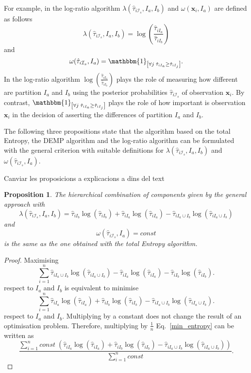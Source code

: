 \documentclass[10pt, a4paper]{article}
\newtheorem{prop}{Proposition}
\newcommand{\m}[1]{\boldsymbol{#1}}
\begin{document}
For example, in the log-ratio algorithm $\lambda(\hat{\tau}_{i \mathcal{I}_s}, I_a, I_b)$ and $\omega(\m x_i, I_a)$ are defined as follows
\[
\lambda(\hat{\tau}_{i \mathcal{I}_s}, I_a, I_b) = \log( \frac{ \hat{\tau}_{iI_a} }{ \hat{\tau}_{iI_b} })
\]
and
\[
\omega(\hat{\tau}_{i \mathcal{I}_s}, I_a) = \mathbbm{1}_{\left[ \forall j\; \hat{\tau}_{i I_{a}} \geq \hat{\tau}_{iI_j} \right]}.
\]
In the log-ratio algorithm $\log( \frac{ \hat{\tau}_{iI_a} }{ \hat{\tau}_{iI_b} })$ plays the role of measuring how different are partition $I_a$ and $I_b$ using the posterior probabilities $\hat{\tau}_{i \mathcal{I}_s}$ of observation $\m x_i$. By contrast, $\mathbbm{1}_{\left[ \forall j\; \hat{\tau}_{i I_{a}} \geq \hat{\tau}_{iI_j} \right]}$ plays the role of how important is observation $\m x_i$ in the decision of asserting the differences of partition $I_a$ and $I_b$.

The following three propositions state that the algorithm based on the total Entropy, the DEMP algorithm and the log-ratio algorithm can be formulated with the general criterion with suitable definitions for $\lambda(\hat{\tau}_{i \mathcal{I}_s}, I_a, I_b)$ and $\omega(\hat{\tau}_{i \mathcal{I}_s}, I_a)$.

{\color{red} Canviar les proposicions a explicacions a dins del text}
\begin{prop}
The hierarchical combination of components given by the general approach with
\[
\lambda(\hat{\tau}_{i \mathcal{I}_s}, I_a, I_b) = \hat{\tau}_{iI_b} \log(\hat{\tau}_{iI_b}) + \hat{\tau}_{iI_a} \log(\hat{\tau}_{iI_a}) - \hat{\tau}_{i I_a \cup I_b} \log(\hat{\tau}_{i I_a \cup I_b})
\]
and
\[
\omega(\hat{\tau}_{i \mathcal{I}_s}, I_a) = const
\]
is the same as the one obtained with the total Entropy algorithm.
\end{prop}
\begin{proof}
Maximising
\[
\sum_{i=1}^n \hat{\tau}_{i I_a \cup I_b} \log(\hat{\tau}_{i I_a \cup I_b}) - \hat{\tau}_{iI_a} \log(\hat{\tau}_{iI_a}) - \hat{\tau}_{iI_b} \log(\hat{\tau}_{iI_b}).
\]
respect to $I_a$ and $I_b$ is equivalent to minimise
\begin{equation}\label{min_entropy}
\sum_{i=1}^n \hat{\tau}_{iI_a} \log(\hat{\tau}_{iI_a}) + \hat{\tau}_{iI_b} \log(\hat{\tau}_{iI_b}) - \hat{\tau}_{i I_a \cup I_b} \log(\hat{\tau}_{i I_a \cup I_b}).
\end{equation}
respect to $I_a$ and $I_b$. Multiplying by a constant does not change the result of an optimisation problem. Therefore, multiplying by $\frac{1}{n}$ Eq.~\ref{min_entropy} can be written as
\[
\frac{\sum_{i=1}^n const \; ( \hat{\tau}_{iI_a} \log(\hat{\tau}_{iI_a}) + \hat{\tau}_{iI_b} \log(\hat{\tau}_{iI_b}) - \hat{\tau}_{i I_a \cup I_b} \log(\hat{\tau}_{i I_a \cup I_b}) )}{\sum_{i=1}^n const}.
\]
\end{proof}
\end{document}
